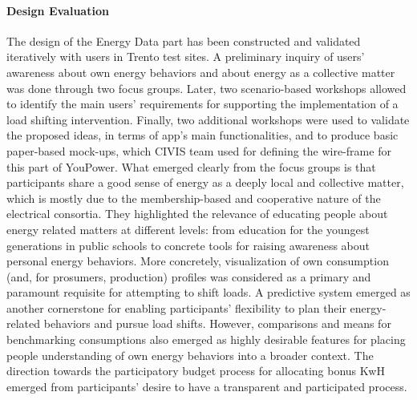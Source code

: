 \paragraph{Design Evaluation}
The design of the Energy Data part has been constructed and validated iteratively with users in Trento test sites. A preliminary inquiry of users' awareness about own energy behaviors and about energy as a collective matter was done through two focus groups. Later, two scenario-based workshops allowed to identify the main users' requirements for supporting the implementation of a load shifting intervention. Finally, two additional workshops were used to validate the proposed ideas, in terms of app's main functionalities, and to produce basic paper-based mock-ups, which CIVIS team used for defining the wire-frame for this part of YouPower.
%
What emerged clearly from the focus groups is that participants share a good sense of energy as a deeply local and collective matter, which is mostly due to the membership-based and cooperative nature of the electrical consortia. They highlighted the relevance of educating people about energy related matters at different levels: from education for the youngest generations in public schools to concrete tools for raising awareness about personal energy behaviors. More concretely, visualization of own consumption (and, for prosumers, production) profiles was considered as a primary and paramount requisite for attempting to shift loads. A predictive system emerged as another cornerstone for enabling participants' flexibility to plan their energy-related behaviors and pursue load shifts. However, comparisons and means for benchmarking consumptions also emerged as highly desirable features for placing people understanding of own energy behaviors into a broader context. The direction towards the participatory budget process for allocating bonus KwH emerged from participants' desire to have a transparent and participated process.
% 

